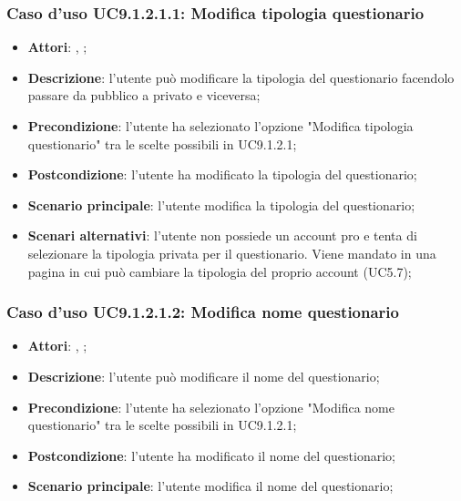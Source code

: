 					\subsubsection{Caso d'uso UC9.1.2.1.1: Modifica tipologia questionario}
					\label{UC9.1.2.1.1}
					\begin{itemize}
						\item \textbf{Attori}: \uau, \uaupro;
						\item \textbf{Descrizione}: l'utente può modificare la tipologia del questionario facendolo passare da pubblico a privato e viceversa; 
						\item \textbf{Precondizione}: l'utente ha selezionato l'opzione "Modifica tipologia questionario" tra le scelte possibili in UC9.1.2.1;
						\item \textbf{Postcondizione}: l'utente ha modificato la tipologia del questionario;
						\item \textbf{Scenario principale}: l'utente modifica la tipologia del questionario;
						\item \textbf{Scenari alternativi}: l'utente non possiede un account pro e tenta di selezionare la tipologia privata per il questionario. Viene mandato in una pagina in cui può cambiare la tipologia del proprio account (UC5.7); 
					\end{itemize}
											
					\subsubsection{Caso d'uso UC9.1.2.1.2: Modifica nome questionario}
					\label{UC9.1.2.1.2}
					\begin{itemize}
						\item \textbf{Attori}: \uau, \uaupro;
						\item \textbf{Descrizione}: l'utente può modificare il nome del questionario; 
						\item \textbf{Precondizione}: l'utente ha selezionato l'opzione "Modifica nome questionario" tra le scelte possibili in UC9.1.2.1;
						\item \textbf{Postcondizione}: l'utente ha modificato il nome del questionario; 
						\item \textbf{Scenario principale}: l'utente modifica il nome del questionario;
					\end{itemize}
																					
